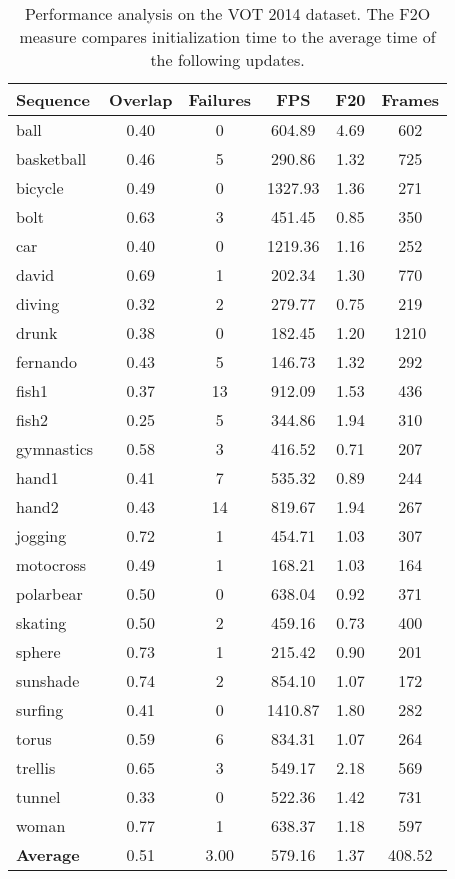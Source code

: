 \documentclass[runningheads]{llncs}
\begin{document}
\begin{table}
\begin{center}
\begin{tabular}{l c c c c c}
\hline 
{\bf Sequence} & {\bf Overlap} & {\bf Failures} & {\bf FPS} & {\bf F20} & {\bf Frames} \\
\hline 
ball & 0.40 & 0 & 604.89 & 4.69 & 602 \\
basketball & 0.46 & 5 & 290.86 & 1.32 & 725 \\
bicycle & 0.49 & 0 & 1327.93 & 1.36 & 271 \\
bolt & 0.63 & 3 & 451.45 & 0.85 & 350 \\
car & 0.40 & 0 & 1219.36 & 1.16 & 252 \\
david & 0.69 & 1 & 202.34 & 1.30 & 770 \\
diving & 0.32 & 2 & 279.77 & 0.75 & 219 \\
drunk & 0.38 & 0 & 182.45 & 1.20 & 1210 \\
fernando & 0.43 & 5 & 146.73 & 1.32 & 292 \\
fish1 & 0.37 & 13 & 912.09 & 1.53 & 436 \\
fish2 & 0.25 & 5 & 344.86 & 1.94 & 310 \\
gymnastics & 0.58 & 3 & 416.52 & 0.71 & 207 \\
hand1 & 0.41 & 7 & 535.32 & 0.89 & 244 \\
hand2 & 0.43 & 14 & 819.67 & 1.94 & 267 \\
jogging & 0.72 & 1 & 454.71 & 1.03 & 307 \\
motocross & 0.49 & 1 & 168.21 & 1.03 & 164 \\
polarbear & 0.50 & 0 & 638.04 & 0.92 & 371 \\
skating & 0.50 & 2 & 459.16 & 0.73 & 400 \\
sphere & 0.73 & 1 & 215.42 & 0.90 & 201 \\
sunshade & 0.74 & 2 & 854.10 & 1.07 & 172 \\
surfing & 0.41 & 0 & 1410.87 & 1.80 & 282 \\
torus & 0.59 & 6 & 834.31 & 1.07 & 264 \\
trellis & 0.65 & 3 & 549.17 & 2.18 & 569 \\
tunnel & 0.33 & 0 & 522.36 & 1.42 & 731 \\
woman & 0.77 & 1 & 638.37 & 1.18 & 597 \\
\hline 
{\bf Average} & 0.51 & 3.00 & 579.16 & 1.37 & 408.52 \\
\hline 
\end{tabular}
\end{center}
\caption{Performance analysis on the VOT 2014 dataset. The F2O measure compares initialization time to the average time of the following updates.}
\label{tbl_performance_analysis}
\end{table}
    
\end{document}
